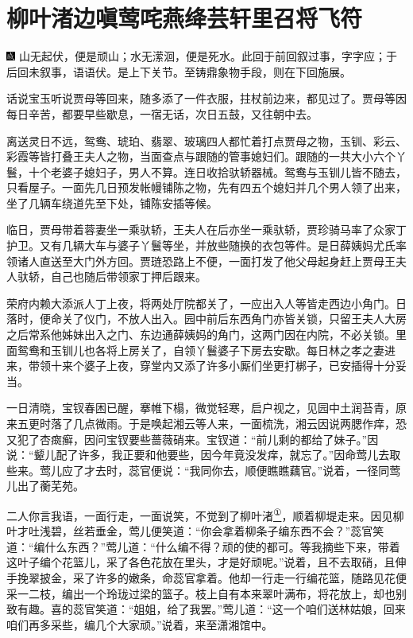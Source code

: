 

\chapter{柳叶渚边嗔莺咤燕\hspace{.5em}绛芸轩里召将飞符}

{\includegraphics[width=3mm]{../Images/00005}  \kaishu 山无起伏，便是顽山；水无潆洄，便是死水。此回于前回叙过事，字字应；于后回未叙事，语语伏。是上下关节。至铸鼎象物手段，则在下回施展。}

话说宝玉听说贾母等回来，随多添了一件衣服，拄杖前边来，都见过了。贾母等因每日辛苦，都要早些歇息，一宿无话，次日五鼓，又往朝中去。

离送灵日不远，鸳鸯、琥珀、翡翠、玻璃四人都忙着打点贾母之物，玉钏、彩云、彩霞等皆打叠王夫人之物，当面查点与跟随的管事媳妇们。跟随的一共大小六个丫鬟，十个老婆子媳妇子，男人不算。连日收拾驮轿器械。鸳鸯与玉钏儿皆不随去，只看屋子。一面先几日预发帐幔铺陈之物，先有四五个媳妇并几个男人领了出来，坐了几辆车绕道先至下处，铺陈安插等候。

临日，贾母带着蓉妻坐一乘驮轿，王夫人在后亦坐一乘驮轿，贾珍骑马率了众家丁护卫。又有几辆大车与婆子丫鬟等坐，并放些随换的衣包等件。是日薛姨妈尤氏率领诸人直送至大门外方回。贾琏恐路上不便，一面打发了他父母起身赶上贾母王夫人驮轿，自己也随后带领家丁押后跟来。

荣府内赖大添派人丁上夜，将两处厅院都关了，一应出入人等皆走西边小角门。日落时，便命关了仪门，不放人出入。园中前后东西角门亦皆关锁，只留王夫人大房之后常系他姊妹出入之门、东边通薛姨妈的角门，这两门因在内院，不必关锁。里面鸳鸯和玉钏儿也各将上房关了，自领丫鬟婆子下房去安歇。每日林之孝之妻进来，带领十来个婆子上夜，穿堂内又添了许多小厮们坐更打梆子，已安插得十分妥当。

一日清晓，宝钗春困已醒，搴帷下榻，微觉轻寒，启户视之，见园中土润苔青，原来五更时落了几点微雨。于是唤起湘云等人来，一面梳洗，湘云因说两腮作痒，恐又犯了杏癍癣，因问宝钗要些蔷薇硝来。宝钗道：``前儿剩的都给了妹子。''因说：``颦儿配了许多，我正要和他要些，因今年竟没发痒，就忘了。''因命莺儿去取些来。莺儿应了才去时，蕊官便说：``我同你去，顺便瞧瞧藕官。''说着，一径同莺儿出了蘅芜苑。

二人你言我语，一面行走，一面说笑，不觉到了柳叶渚\href{../Text/part0063_split_000.html\#lnkback_1_a}{\textsuperscript{①}}，顺着柳堤走来。因见柳叶才吐浅碧，丝若垂金，莺儿便笑道：``你会拿着柳条子编东西不会？''蕊官笑道：``编什么东西？''莺儿道：``什么编不得？顽的使的都可。等我摘些下来，带着这叶子编个花篮儿，采了各色花放在里头，才是好顽呢。''说着，且不去取硝，且伸手挽翠披金，采了许多的嫩条，命蕊官拿着。他却一行走一行编花篮，随路见花便采一二枝，编出一个玲珑过梁的篮子。枝上自有本来翠叶满布，将花放上，却也别致有趣。喜的蕊官笑道：``姐姐，给了我罢。''莺儿道：``这一个咱们送林姑娘，回来咱们再多采些，编几个大家顽。''说着，来至潇湘馆中。

